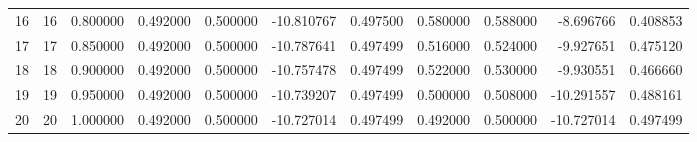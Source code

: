 \begin{tabular}{lrrrrrrrrrr}
16 & 16 & 0.800000 & 0.492000 & 0.500000 & -10.810767 & 0.497500 & 0.580000 & 0.588000 & -8.696766 & 0.408853 \\
17 & 17 & 0.850000 & 0.492000 & 0.500000 & -10.787641 & 0.497499 & 0.516000 & 0.524000 & -9.927651 & 0.475120 \\
18 & 18 & 0.900000 & 0.492000 & 0.500000 & -10.757478 & 0.497499 & 0.522000 & 0.530000 & -9.930551 & 0.466660 \\
19 & 19 & 0.950000 & 0.492000 & 0.500000 & -10.739207 & 0.497499 & 0.500000 & 0.508000 & -10.291557 & 0.488161 \\
20 & 20 & 1.000000 & 0.492000 & 0.500000 & -10.727014 & 0.497499 & 0.492000 & 0.500000 & -10.727014 & 0.497499 \\
\bottomrule
\end{tabular}
